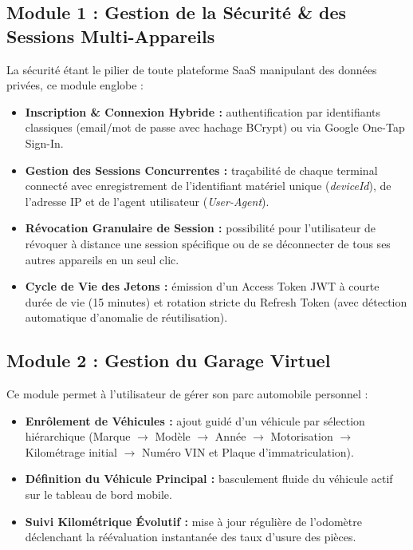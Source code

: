 \documentclass[12pt,a4paper,twoside,openright]{report}
\newcommand{\itembullet}{\textcolor{secondaryBlue}{$\blacktriangleright$}}
\begin{document}
  \subsection{Module 1 : Gestion de la S\'ecurit\'e \& des Sessions Multi-Appareils}
  La s\'ecurit\'e \'etant le pilier de toute plateforme SaaS manipulant des donn\'ees priv\'ees, ce module englobe :
  \begin{itemize}[label=\itembullet]
    \item \textbf{Inscription \& Connexion Hybride :} authentification par identifiants classiques (email/mot de passe avec hachage BCrypt) ou via Google One-Tap Sign-In.
    \item \textbf{Gestion des Sessions Concurrentes :} tra\c{c}abilit\'e de chaque terminal connect\'e avec enregistrement de l'identifiant mat\'eriel unique (\textit{deviceId}), de l'adresse IP et de l'agent utilisateur (\textit{User-Agent}).
    \item \textbf{R\'evocation Granulaire de Session :} possibilit\'e pour l'utilisateur de r\'evoquer \`a distance une session sp\'ecifique ou de se d\'econnecter de tous ses autres appareils en un seul clic.
    \item \textbf{Cycle de Vie des Jetons :} \'emission d'un Access Token JWT \`a courte dur\'ee de vie (15 minutes) et rotation stricte du Refresh Token (avec d\'etection automatique d'anomalie de r\'eutilisation).
  \end{itemize}

  \subsection{Module 2 : Gestion du Garage Virtuel}
  Ce module permet \`a l'utilisateur de g\'erer son parc automobile personnel :
  \begin{itemize}[label=\itembullet]
    \item \textbf{Enr\^olement de V\'ehicules :} ajout guid\'e d'un v\'ehicule par s\'election hi\'erarchique (Marque $\rightarrow$ Mod\`ele $\rightarrow$ Ann\'ee $\rightarrow$ Motorisation $\rightarrow$ Kilom\'etrage initial $\rightarrow$ Num\'ero VIN et Plaque d'immatriculation).
    \item \textbf{D\'efinition du V\'ehicule Principal :} basculement fluide du v\'ehicule actif sur le tableau de bord mobile.
    \item \textbf{Suivi Kilom\'etrique \'Evolutif :} mise \`a jour r\'eguli\`ere de l'odom\`etre d\'eclenchant la r\'e\'evaluation instantan\'ee des taux d'usure des pi\`eces.
  \end{itemize}
\end{document}
